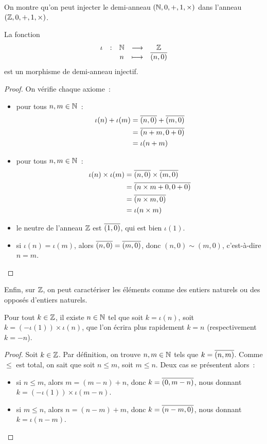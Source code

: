 On montre qu'on peut injecter le demi-anneau $(\mathbb N,0,+,1,\times)$ dans
l'anneau $(\mathbb Z,0,+,1,\times)$.

\begin{proposition}
  La fonction
  \[
  \makeFun{\iota}{\bN}{\bZ}{n}{\clas{(n,0)}}
  \]
  est un morphisme de demi-anneau injectif.
\end{proposition}

\begin{proof}
  On vérifie chaque axiome~:
  \begin{itemize}
  \item pour tous $n,m\in\mathbb N$~:
    \begin{align*}
      \iota(n) + \iota(m) &= \overline{(n,0)} + \overline{(m,0)}\\
      &= \overline{(n+m,0+0)}\\
      &= \iota(n+m)
    \end{align*}
  \item pour tous $n,m\in\mathbb N$~:
    \begin{align*}
      \iota(n)\times \iota(m) &= \overline{(n,0)} \times \overline{(m,0)}\\
      &= \overline{(n \times m + 0, 0 + 0)}\\
      &= \overline{(n\times m,0)}\\
      &= \iota(n\times m)
    \end{align*}
  \item le neutre de l'anneau $\mathbb Z$ est $\overline{(1,0)}$, qui est bien
    $\iota(1)$.
  \item si $\iota(n) = \iota(m)$, alors $\overline{(n,0)} = \overline{(m,0)}$,
    donc $(n,0)\sim (m,0)$, c'est-à-dire $n = m$.\qedhere
  \end{itemize}
\end{proof}

Enfin, sur $\mathbb Z$, on peut caractériser les éléments comme des entiers
naturels ou des opposés d'entiers naturels.

\begin{proposition}
  Pour tout $k \in \mathbb Z$, il existe $n \in \mathbb N$ tel que soit
  $k = \iota(n)$, soit $k = (-\iota(1)) \times \iota(n)$, que l'on écrira
  plus rapidement $k = n$ (respectivement $k = -n$).
\end{proposition}

\begin{proof}
  Soit $k \in \mathbb Z$. Par définition, on trouve $n,m\in\mathbb N$ tels que
  $k = \overline{(n,m)}$. Comme $\leq$ est total, on sait que soit
  $n \leq m$, soit $m \leq n$. Deux cas se présentent alors~:
  \begin{itemize}
  \item si $n \leq m$, alors $m = (m - n) + n$, donc $k = \overline{(0,m - n)}$,
    nous donnant $k = (-\iota(1))\times \iota(m-n)$.
  \item si $m \leq n$, alors $n = (n - m) + m$, donc
    $k = \overline{(n - m, 0)}$, nous donnant $k = \iota(n-m)$.\qedhere
  \end{itemize}
\end{proof}

